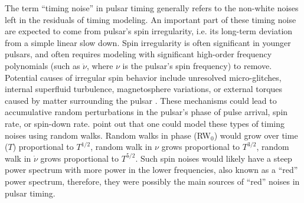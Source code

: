 The term ``timing noise'' in pulsar timing generally refers to the non-white
noises left in the residuals of timing modeling.
An important part of these timing noise are expected to come from pulsar's spin
irregularity, i.e. its long-term deviation from a simple linear slow down. 
Spin irregularity is often significant in younger pulsars, and often
requires modeling with significant high-order frequency polynomials (such as $\ddot{\nu}$, where $\nu$ is the pulsar's spin frequency) to remove. 
Potential causes of irregular spin behavior include unresolved
micro-glitches, internal superfluid turbulence, magnetosphere variations, or external torques caused by matter surrounding the pulsar \citep{hlk10, ymh+13, ml14}.
{\bfref These mechanisms could lead to accumulative random perturbations in the 
pulsar's phase of pulse arrival, spin rate, or spin-down rate. 
\citet{sc10} point out that one could model these types of timing noises using random walks.
Random walks in phase (RW$_0$) would grow over time ($T$) proportional to
$T^{1/2}$, random walk in $\nu$ grows proportional to $T^{3/2}$, random walk in
$\dot{\nu}$ grows proportional to $T^{5/2}$.
Such spin noises would likely have a steep power spectrum with more power in
the lower frequencies, also known as a ``red'' power spectrum, therefore, they
were possibly the main sources of ``red'' noises in pulsar timing.
}

